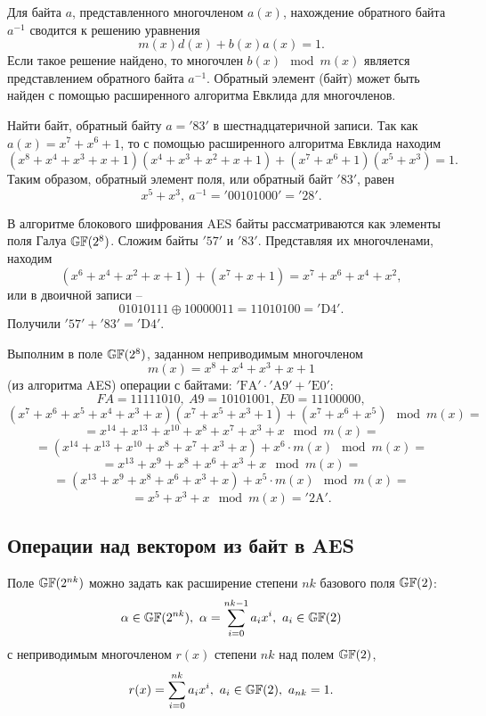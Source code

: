Для байта $a$, представленного многочленом $a(x)$, нахождение обратного байта $a^{-1}$ сводится к решению уравнения
    \[ m(x) d(x) + b(x) a(x) = 1. \]
Если такое решение найдено, то многочлен $b(x) \mod m(x)$ является представлением обратного байта $a^{-1}$. Обратный элемент (байт) может быть найден с помощью расширенного алгоритма Евклида для многочленов.

\example
Найти байт, обратный байту $a = \mathrm{'83'}$ в шестнадцатеричной записи. Так как $a(x) = x^{7} + x^{6} + 1$, то с помощью расширенного алгоритма Евклида находим
    \[ (x^{8} + x^{4} + x^{3} + x + 1) (x^{4} + x^{3} + x^{2} + x + 1) + (x^{7} + x^{6} + 1) (x^{5} + x^{3}) = 1. \]
Таким образом, обратный элемент поля, или обратный байт $\mathrm{'83'}$, равен
    \[ x^{5} + x^{3}, ~ a^{-1} = \mathrm{'00101000'} = \mathrm{'28'}. \]
\exampleend

\example
В алгоритме блокового шифрования AES байты рассматриваются как элементы поля Галуа $\mathbb{GF}(2^8)$. Сложим байты $\mathrm{'57'}$ и $\mathrm{'83'}$. Представляя их многочленами, находим
    \[ (x^6 + x^4 + x^2 + x + 1) + (x^7 + x + 1) = x^7 + x^6 + x^4 + x^2, \]
или в двоичной записи --
    \[ 01010111 \oplus 10000011 = 11010100 = \mathrm{'D4'}. \]
Получили $\mathrm{'57'} + \mathrm{'83'} = \mathrm{'D4'}$.
\exampleend

\example
Выполним в поле $\mathbb{GF}(2^8)$, заданном неприводимым многочленом
    \[ m(x) = x^8 + x^4 + x^3 + x + 1 \]
(из алгоритма AES) операции с байтами: $\mathrm{'FA'} \cdot \mathrm{'A9'} + \mathrm{'E0'}$:
    \[ FA = 11111010, ~ A9 = 10101001, ~ E0 = 11100000, \]
    \[ (x^7 + x^6 + x^5 + x^4 + x^3  +x)(x^7 + x^5 + x^3 + 1) + (x^7 + x^6 + x^5) \mod m(x) = \]
    \[ = x^{14} + x^{13} + x^{10} + x^{8} + x^7 + x^3 + x \mod m(x) = \]
    \[ = (x^{14} + x^{13} + x^{10} + x^{8} + x^7 + x^3 + x) + x^6 \cdot m(x) \mod m(x) = \]
    \[ = x^{13} + x^9 + x^8 + x^6 + x^3 + x \mod m(x) = \]
    \[ = (x^{13} + x^9 + x^8 + x^6 + x^3 + x) + x^5 \cdot m(x) \mod m(x) = \]
    \[ = x^5 + x^3 + x \mod m(x) = \mathrm{'2A'}. \]
\exampleend


\subsection{Операции над вектором из байт в AES}

Поле $\mathbb{GF}(2^{nk})$ можно задать как расширение степени $nk$ базового поля $\mathbb{GF}(2)$:
    \[ \alpha \in \mathbb{GF}(2^{nk}), ~ \alpha = \sum\limits_{i=0}^{nk-1} a_i x^i, ~ a_i \in \mathbb{GF}(2) \]
с неприводимым многочленом $r(x)$ степени $nk$ над полем $\mathbb{GF}(2)$,
    \[ r(x) = \sum\limits_{i=0}^{nk} a_i x^i, ~ a_i \in \mathbb{GF}(2), ~ a_{nk} = 1. \]


